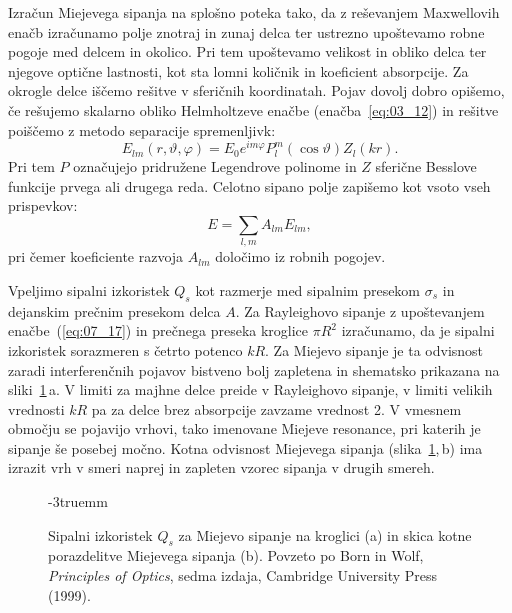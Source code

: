 Izračun Miejevega sipanja na splošno poteka tako, da z reševanjem Maxwellovih enačb 
izračunamo polje znotraj in zunaj delca ter ustrezno upoštevamo robne pogoje med 
delcem in okolico. Pri tem upoštevamo velikost in obliko delca ter njegove optične
lastnosti, kot sta lomni količnik in koeficient absorpcije. Za okrogle delce 
iščemo rešitve v sferičnih koordinatah. Pojav dovolj dobro opišemo, če rešujemo skalarno
obliko Helmholtzeve enačbe (enačba~\ref{eq:03_12}) in rešitve
poiščemo z metodo separacije spremenljivk:
\begin{equation}
E_{lm}(r,\vartheta, \varphi) = 
E_0 e^{im\varphi}P_l^m (\cos \vartheta) Z_l (kr).
\label{eq:07_20}
\end{equation}
Pri tem $P$ označujejo pridružene Legendrove polinome in $Z$ sferične Besslove 
funkcije prvega ali drugega reda. Celotno sipano polje zapišemo kot vsoto vseh prispevkov:
\begin{equation}
E = \sum_{l,m} A_{lm}E_{lm},
\label{eq:07_21}
\end{equation}
pri čemer koeficiente razvoja $A_{lm}$ določimo iz robnih pogojev. 

Vpeljimo sipalni izkoristek $Q_s$ kot razmerje
med sipalnim presekom $\sigma_s$ in dejanskim prečnim presekom delca $A$.
Za Rayleighovo sipanje z upoštevanjem enačbe~(\ref{eq:07_17}) in prečnega preseka kroglice $\pi R^2$
izračunamo, da je sipalni izkoristek sorazmeren s četrto
potenco $kR$. Za Miejevo sipanje je ta odvisnost zaradi interferenčnih pojavov bistveno
bolj zapletena in shematsko prikazana na sliki~\ref{fig:07_MieGraf}\,a. V limiti za majhne delce
preide v Rayleighovo sipanje, v limiti velikih vrednosti $kR$ pa za delce brez 
absorpcije zavzame vrednost 2. V vmesnem območju se pojavijo vrhovi, tako imenovane Miejeve resonance, 
pri katerih je sipanje še posebej močno. Kotna odvisnost Miejevega sipanja 
(slika~\ref{fig:07_MieGraf},\,b) ima izrazit vrh v smeri naprej in zapleten vzorec 
sipanja v drugih smereh. 
\begin{figure}[!ht]
\centering
\def\svgwidth{140truemm} 

\caption{Sipalni izkoristek $Q_s$ za Miejevo sipanje na kroglici (a) in skica kotne porazdelitve
Miejevega sipanja (b). Povzeto po Born in Wolf, {\it Principles of Optics}, sedma izdaja, Cambridge University Press (1999).
}
\label{fig:07_MieGraf}
\vglue-3truemm
\end{figure}

